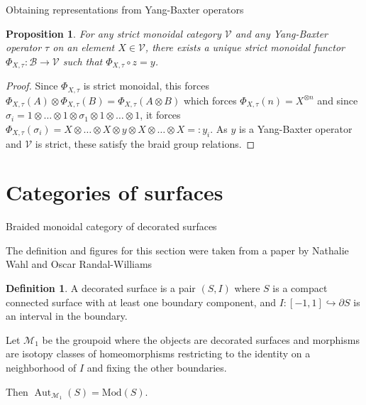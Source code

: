 \documentclass{beamer}
\newtheorem{prop}[thm]{Proposition}
\theoremstyle{definition}
\newtheorem{df}[thm]{Definition}
\theoremstyle{remark}
\DeclareMathOperator{\Aut}{Aut}
\newcommand{\Mod}{{\mathrm{Mod}}}
\begin{document}
\begin{frame}{Obtaining representations from Yang-Baxter operators}
    \begin{prop}
        For any strict monoidal category
        $\mathcal{V}$ and
        any Yang-Baxter operator
        $\tau$ on an element
        $X \in \mathcal{V}$, there
        exists a unique strict 
        monoidal functor 
        $\Phi_{X, \tau} \colon
        \mathcal{B} \to 
        \mathcal{V}$ such that
        $\Phi_{X, \tau} \circ z = y$.
    \end{prop}

    \begin{proof}
        Since $\Phi_{X,\tau}$ is strict
        monoidal, this forces
        $\Phi_{X,\tau} (A) \otimes
        \Phi_{X,\tau} (B) =
        \Phi_{X,\tau}(A \otimes B)$ which
        forces $\Phi_{X,\tau} 
        (n) = X^{\otimes n}$ and
        since $\sigma_i = 
        1 \otimes \ldots \otimes 1 \otimes
        \sigma_1 \otimes 1 \otimes \ldots
        \otimes 1$, it forces
        $\Phi_{X,\tau}(\sigma_i)
        = X \otimes \ldots \otimes
        X \otimes y \otimes X
        \otimes \ldots \otimes X =: y_i$.
        As $y$ is a Yang-Baxter operator
        and $\mathcal{V}$ is strict,
        these satisfy the braid group
        relations.
    \end{proof}
\end{frame}

\section{Categories of surfaces}

\begin{frame}{Braided monoidal category of decorated surfaces}

The definition and figures for this section were taken from a paper by Nathalie Wahl and Oscar Randal-Williams

    \begin{df}
        A decorated surface is a pair
        $(S, I)$ where $S$ is a 
        compact connected surface 
        with at least one boundary
        component, and
        $I \colon [-1,1] 
        \hookrightarrow \partial S$
        is an interval in the boundary.

        Let $\mathcal{M}_1$ be
        the groupoid where the objects
        are decorated surfaces and
        morphisms are isotopy classes of
        homeomorphisms restricting to
        the identity on a neighborhood
        of $I$ and fixing the other boundaries. 
    \end{df}

    Then $\Aut_{\mathcal{M}_1}(S)
    = \Mod(S)$.
\end{frame}
\end{document}
